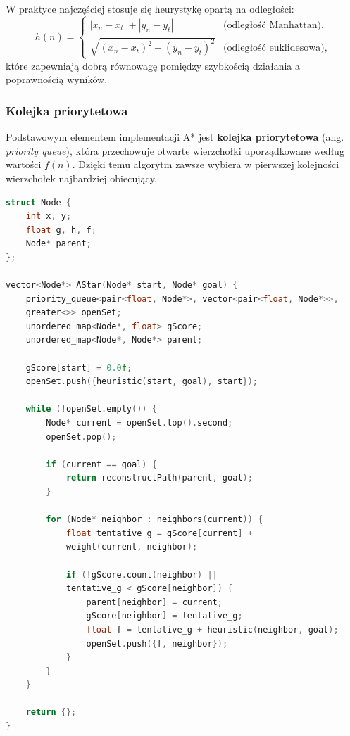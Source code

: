 \documentclass[a4paper,12pt]{book} %
\begin{document}
W praktyce najczęściej stosuje się heurystykę opartą na odległości:
\[
h(n) = 
\begin{cases}
|x_n - x_t| + |y_n - y_t| & \text{(odległość Manhattan)},\\
\sqrt{(x_n - x_t)^2 + (y_n - y_t)^2} & \text{(odległość euklidesowa)},
\end{cases}
\]
które zapewniają dobrą równowagę pomiędzy szybkością działania a poprawnością wyników.

\subsubsection*{Kolejka priorytetowa}

Podstawowym elementem implementacji A* jest \textbf{kolejka priorytetowa} (ang. \textit{priority queue}), 
która przechowuje otwarte wierzchołki uporządkowane według wartości $f(n)$. 
Dzięki temu algorytm zawsze wybiera w pierwszej kolejności wierzchołek najbardziej obiecujący.

\begin{lstlisting}[language=C++, caption={Przykład algorytmu A*}, label={lst:astar}]
struct Node {
    int x, y;
    float g, h, f;
    Node* parent;
};

vector<Node*> AStar(Node* start, Node* goal) {
    priority_queue<pair<float, Node*>, vector<pair<float, Node*>>,
    greater<>> openSet;
    unordered_map<Node*, float> gScore;
    unordered_map<Node*, Node*> parent;

    gScore[start] = 0.0f;
    openSet.push({heuristic(start, goal), start});

    while (!openSet.empty()) {
        Node* current = openSet.top().second;
        openSet.pop();

        if (current == goal) {
            return reconstructPath(parent, goal);
        }

        for (Node* neighbor : neighbors(current)) {
            float tentative_g = gScore[current] + 
            weight(current, neighbor);

            if (!gScore.count(neighbor) || 
            tentative_g < gScore[neighbor]) {
                parent[neighbor] = current;
                gScore[neighbor] = tentative_g;
                float f = tentative_g + heuristic(neighbor, goal);
                openSet.push({f, neighbor});
            }
        }
    }

    return {};
}

\end{lstlisting}
\end{document}
